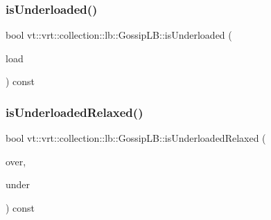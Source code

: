 \mbox{\label{structvt_1_1vrt_1_1collection_1_1lb_1_1_gossip_l_b_a8714236643dcb620aa29956a6ff26b48}} 
\subsubsection{\texorpdfstring{is\+Underloaded()}{isUnderloaded()}}
{\footnotesize\ttfamily bool vt\+::vrt\+::collection\+::lb\+::\+Gossip\+L\+B\+::is\+Underloaded (\begin{DoxyParamCaption}\item[{\hyperlink{structvt_1_1vrt_1_1collection_1_1lb_1_1_base_l_b_a215e22b9f12678303f49615ae3be05cc}{Load\+Type}}]{load }\end{DoxyParamCaption}) const\hspace{0.3cm}{\ttfamily [protected]}}

\mbox{\label{structvt_1_1vrt_1_1collection_1_1lb_1_1_gossip_l_b_a292dbba1aaa750b5c1303570874d5e38}} 
\subsubsection{\texorpdfstring{is\+Underloaded\+Relaxed()}{isUnderloadedRelaxed()}}
{\footnotesize\ttfamily bool vt\+::vrt\+::collection\+::lb\+::\+Gossip\+L\+B\+::is\+Underloaded\+Relaxed (\begin{DoxyParamCaption}\item[{\hyperlink{structvt_1_1vrt_1_1collection_1_1lb_1_1_base_l_b_a215e22b9f12678303f49615ae3be05cc}{Load\+Type}}]{over,  }\item[{\hyperlink{structvt_1_1vrt_1_1collection_1_1lb_1_1_base_l_b_a215e22b9f12678303f49615ae3be05cc}{Load\+Type}}]{under }\end{DoxyParamCaption}) const\hspace{0.3cm}{\ttfamily [protected]}}

